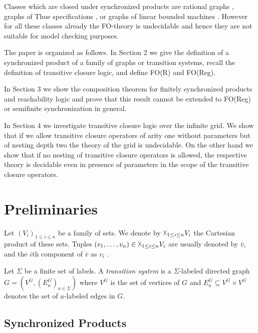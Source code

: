 \documentclass{LMCS}
\begin{document}
Classes which are closed under synchronized products are rational graphs
\cite{mo00}, graphs of Thue specifications \cite{pay00}, or graphs
of linear bounded machines \cite{kp99}. However for all these
classes already the FO-theory is undecidable and hence they 
are not suitable for model checking purposes.



The paper is organized as follows. In Section 2 we give the definition
of a synchronized product of a family of graphs or transition systems, 
recall the definition of transitive closure logic, and define FO(R) and FO(Reg).

In Section 3 we show the composition theorem for finitely synchronized 
products and reachability logic and prove that this result cannot be extended 
to FO(Reg) or semifinite synchronization in general.

In Section 4 we investigate transitive closure logic over the infinite grid.
We show that if we allow transitive closure operators of arity one without 
parameters but of nesting depth two the theory of the grid is undecidable.
On the other hand we show that if no nesting of transitive closure operators is
allowed, the respective theory is decidable even in presence of parameters
in the scope of the transitive closure operators. 

\section{Preliminaries}

Let $(V_i)_{1 \le i \le n}$ be a family of sets. We denote by 
$\vartimes_{1 \le i \le n} V_i$ the Cartesian product of these sets.
Tuples $(v_1,\ldots, v_n) \in \vartimes_{1 \le i \le n} V_i$ are usually denoted
by $\bar v$, and the $i$th component of $\bar v$ as $v_i$ .

Let $\Sigma$ be a finite set of labels. A \emph{transition system} is a 
$\Sigma$-labeled directed graph $G=(V^G, (E_a^G)_{a \in \Sigma})$ where $V^G$ 
is the set of vertices of $G$ and $E_a^G \subseteq V^G \times V^G$
denotes the set of $a$-labeled edges in $G$.















\subsection{Synchronized Products}
\end{document}

